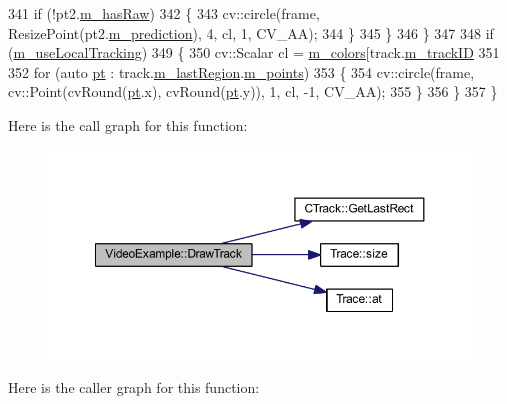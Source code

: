 \begin{DoxyCode}
341             \textcolor{keywordflow}{if} (!pt2.\mbox{\hyperlink{struct_trajectory_point_aedf0113745aff30b359a60401ddcf076}{m\_hasRaw}})
342             \{
343                 cv::circle(frame, ResizePoint(pt2.\mbox{\hyperlink{struct_trajectory_point_a967909b451c226e4927a2b96fcecbb6e}{m\_prediction}}), 4, cl, 1, CV\_AA);
344             \}
345         \}
346     \}
347 
348     \textcolor{keywordflow}{if} (\mbox{\hyperlink{class_video_example_a951ee017c4fbb180dfc965a9a35ac69f}{m\_useLocalTracking}})
349     \{
350         cv::Scalar cl = \mbox{\hyperlink{class_video_example_a2b6d4a6e85d52d13d8899c57cc6ddc66}{m\_colors}}[track.\mbox{\hyperlink{class_c_track_a8aae01d68f5a1a6c0292476ea19c89f9}{m\_trackID}} %
351 
352         \textcolor{keywordflow}{for} (\textcolor{keyword}{auto} \mbox{\hyperlink{rings_8cpp_af69bbacaaf68a115b351c5d1e29c3cc8}{pt}} : track.\mbox{\hyperlink{class_c_track_a5af91fbfad7ebf07bd0f681f915e440c}{m\_lastRegion}}.\mbox{\hyperlink{class_c_region_a65be08ae81a8d174d95ae35a2f7fb212}{m\_points}})
353         \{
354             cv::circle(frame, cv::Point(cvRound(\mbox{\hyperlink{rings_8cpp_af69bbacaaf68a115b351c5d1e29c3cc8}{pt}}.x), cvRound(\mbox{\hyperlink{rings_8cpp_af69bbacaaf68a115b351c5d1e29c3cc8}{pt}}.y)), 1, cl, -1, CV\_AA);
355         \}
356     \}
357 \}
\end{DoxyCode}
Here is the call graph for this function\+:\nopagebreak
\begin{figure}[H]
\begin{center}
\leavevmode
\includegraphics[width=350pt]{class_video_example_a84a040bc87b915c5ee18c5d11235f40c_cgraph}
\end{center}
\end{figure}
Here is the caller graph for this function\+:\nopagebreak
